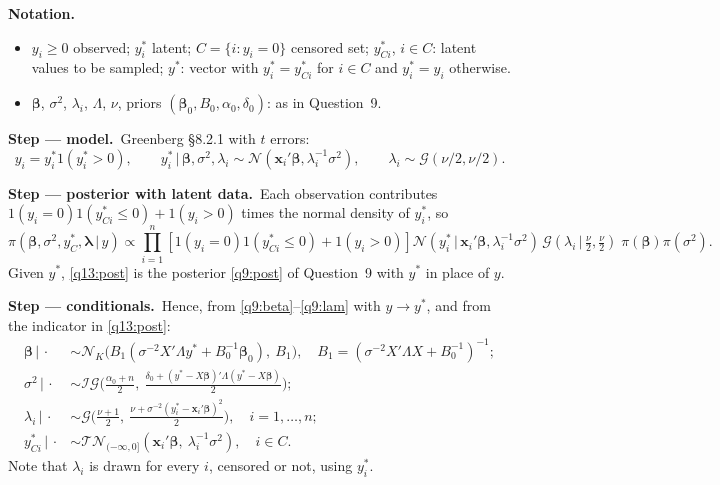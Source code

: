 \documentclass[11pt,a4paper]{article}
\numberwithin{equation}{questao}
\newenvironment{notacao}{\par\smallskip\noindent\textbf{Notation.}\begin{itemize}[leftmargin=1.4em,topsep=1pt,itemsep=0pt]\small}{\end{itemize}}
\newcommand{\passo}[2]{\par\smallskip\noindent\textbf{Step --- #1.}~#2}
\newcommand{\TN}{\mathcal{TN}}
\newcommand{\N}{\mathcal{N}}
\newcommand{\IG}{\mathcal{IG}}
\newcommand{\Ga}{\mathcal{G}}
\begin{document}
\begin{sol}
\begin{notacao}
\item $y_i\ge0$ observed; $y_i^*$ latent; $C=\{i:y_i=0\}$ censored set; $y_{Ci}^*$, $i\in C$: latent values to be sampled; $y^*$: vector with $y_i^*=y_{Ci}^*$ for $i\in C$ and $y_i^*=y_i$ otherwise.
\item $\boldsymbol\beta$, $\sigma^2$, $\lambda_i$, $\Lambda$, $\nu$, priors $(\boldsymbol\beta_0,B_0,\alpha_0,\delta_0)$: as in Question~9.
\end{notacao}

\passo{model}{Greenberg §8.2.1 with $t$ errors:
\begin{equation}
y_i=y_i^*1(y_i^*>0),\qquad y_i^*\,|\,\boldsymbol\beta,\sigma^2,\lambda_i\sim\N(\mathbf{x}_i'\boldsymbol\beta,\lambda_i^{-1}\sigma^2),\qquad\lambda_i\sim\Ga(\nu/2,\nu/2). \label{q13:model}
\end{equation}}

\passo{posterior with latent data}{Each observation contributes $1(y_i=0)1(y_{Ci}^*\le0)+1(y_i>0)$ times the normal density of $y_i^*$, so
\begin{equation}
\pi(\boldsymbol\beta,\sigma^2,y_C^*,\boldsymbol\lambda\,|\,y)\propto\prod_{i=1}^n\left[1(y_i=0)1(y_{Ci}^*\le0)+1(y_i>0)\right]\N(y_i^*\,|\,\mathbf{x}_i'\boldsymbol\beta,\lambda_i^{-1}\sigma^2)\,\Ga(\lambda_i\,|\,\tfrac\nu2,\tfrac\nu2)\;\pi(\boldsymbol\beta)\pi(\sigma^2). \label{q13:post}
\end{equation}
Given $y^*$, \eqref{q13:post} is the posterior \eqref{q9:post} of Question~9 with $y^*$ in place of $y$.}

\passo{conditionals}{Hence, from \eqref{q9:beta}--\eqref{q9:lam} with $y\to y^*$, and from the indicator in \eqref{q13:post}:
\begin{align}
\boldsymbol\beta\,|\,\cdot&\sim\N_K\big(B_1(\sigma^{-2}X'\Lambda y^*+B_0^{-1}\boldsymbol\beta_0),\ B_1\big),\quad B_1=(\sigma^{-2}X'\Lambda X+B_0^{-1})^{-1}; \label{q13:beta}\\
\sigma^2\,|\,\cdot&\sim\IG\Big(\tfrac{\alpha_0+n}{2},\ \tfrac{\delta_0+(y^*-X\boldsymbol\beta)'\Lambda(y^*-X\boldsymbol\beta)}{2}\Big); \label{q13:sig}\\
\lambda_i\,|\,\cdot&\sim\Ga\Big(\tfrac{\nu+1}{2},\ \tfrac{\nu+\sigma^{-2}(y_i^*-\mathbf{x}_i'\boldsymbol\beta)^2}{2}\Big),\quad i=1,\dots,n; \label{q13:lam}\\
y_{Ci}^*\,|\,\cdot&\sim\TN_{(-\infty,0]}(\mathbf{x}_i'\boldsymbol\beta,\ \lambda_i^{-1}\sigma^2),\quad i\in C. \label{q13:yc}
\end{align}
Note that $\lambda_i$ is drawn for every $i$, censored or not, using $y_i^*$.}


\end{sol}
\end{document}
